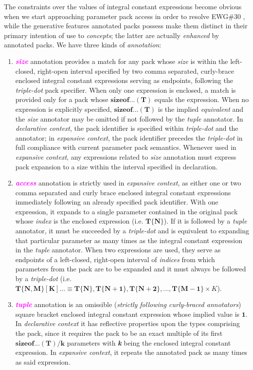\p The constraints over the values of integral constant expressions become obvious when we start approaching parameter pack access in order to resolve EWG\#30 \cite{Abrahams2012}, while the generative features annotated packs possess make them distinct in their primary intention of use to \textit{concepts}; the latter are actually \textit{enhanced} by annotated packs.
We have three kinds of \textit{annotation}:
\begin{enumerate}
\item\p \textcolor{Magenta}{\textbf{\textit{size}}} annotation provides a match for any pack whose \textit{size} is within the left-closed, right-open interval specified by two comma separated, curly-brace enclosed integral constant expressions serving as endpoints, following the \textit{triple-dot} pack specifier.
When only one expression is enclosed, a match is provided only for a pack whose $\bm{sizeof...(T)}$ equals the expression.
When no expression is explicitly specified, $\bm{sizeof...(T)}$ is the implied \textit{equivalent} and the \textit{size} annotator may be omitted if not followed by the \textit{tuple} annotator.
In \textit{declarative context}, the pack identifier is specified within \textit{triple-dot} and the annotator; in \textit{expansive context}, the pack identifier precedes the \textit{triple-dot} in full compliance with current parameter pack semantics.
Whenever used in \textit{expansive context}, any expressions related to \textit{size} annotation must express pack expansion to a size within the interval specified in declaration.

\item\p \textcolor{Magenta}{\textbf{\textit{access}}} annotation is strictly used in \textit{expansive context}, as either one or two comma separated and curly brace enclosed integral constant expressions immediately following an already specified pack identifier.
With one expression, it expands to a single parameter contained in the original pack whose \textit{index} is the enclosed expression (i.e. $\bm{T\{N\}}$). If it is followed by a \textit{tuple} annotator, it must be succeeded by a \textit{triple-dot} and is equivalent to expanding that particular parameter as many times as the integral constant expression in the \textit{tuple} annotator.
When two expressions are used, they serve as endpoints of a left-closed, right-open interval of \textit{indices} from which parameters from the pack are to be expanded and it must always be followed by a \textit{triple-dot} (i.e. $\bm{T\{N,M\}[K]... \equiv T\{N\},T\{N+1\},T\{N+2\},...,T\{M-1\}} \times K $).

\item\p \textcolor{Magenta}{\textbf{\textit{tuple}}} annotation is an omissible (\textit{strictly following curly-braced annotators}) square bracket enclosed integral constant expression whose implied value is $\bm{1}$.
In \textit{declarative context} it has reflective properties upon the types comprising the pack, since it requires the pack to be an exact multiple of its first $\bm{sizeof...(T)/k}$ parameters  with \textbf{\textit{k}} being the enclosed integral constant expression.
In \textit{expansive context}, it repeats the annotated pack as many times as said expression.
\end{enumerate}


